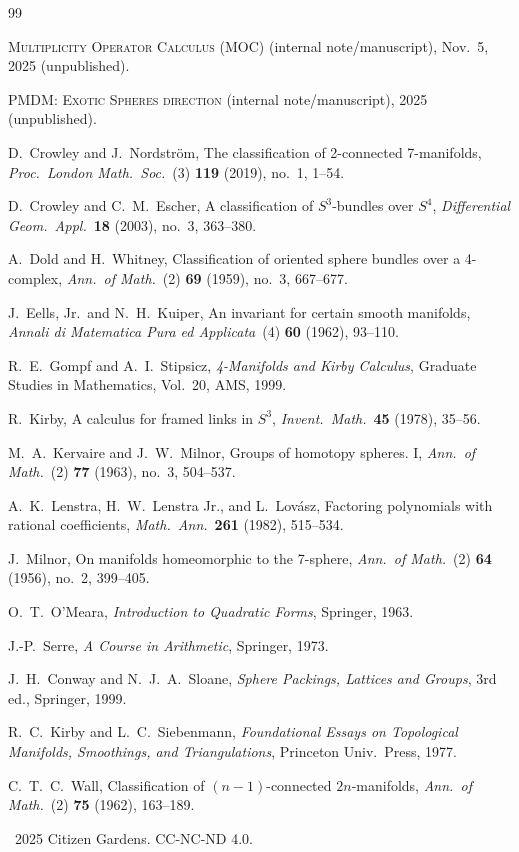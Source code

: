 \documentclass[11pt]{article}
\begin{document}
\begin{thebibliography}{99}

\textsc{Multiplicity Operator Calculus (MOC)} (internal note/manuscript), Nov.\ 5, 2025 (unpublished).

\textsc{PMDM: Exotic Spheres direction} (internal note/manuscript), 2025 (unpublished).

D.~Crowley and J.~Nordstr{\"o}m,
\newblock The classification of 2-connected 7-manifolds,
\newblock \emph{Proc.\ London Math.\ Soc.}\ (3) \textbf{119} (2019), no.~1, 1--54.

D.~Crowley and C.~M.~Escher,
\newblock A classification of $S^3$-bundles over $S^4$,
\newblock \emph{Differential Geom.\ Appl.}\ \textbf{18} (2003), no.~3, 363--380.

A.~Dold and H.~Whitney,
\newblock Classification of oriented sphere bundles over a 4-complex,
\newblock \emph{Ann.\ of Math.}\ (2) \textbf{69} (1959), no.~3, 667--677.

J.~Eells, Jr.\ and N.~H.~Kuiper,
\newblock An invariant for certain smooth manifolds,
\newblock \emph{Annali di Matematica Pura ed Applicata}\ (4) \textbf{60} (1962), 93--110.

R.~E.~Gompf and A.~I.~Stipsicz,
\newblock \emph{4-Manifolds and Kirby Calculus},
\newblock Graduate Studies in Mathematics, Vol.\ 20, AMS, 1999.

R.~Kirby,
\newblock A calculus for framed links in $S^3$,
\newblock \emph{Invent.\ Math.}\ \textbf{45} (1978), 35--56.

M.~A.~Kervaire and J.~W.~Milnor,
\newblock Groups of homotopy spheres. I,
\newblock \emph{Ann.\ of Math.}\ (2) \textbf{77} (1963), no.~3, 504--537.

A.~K.~Lenstra, H.~W.~Lenstra Jr., and L.~Lov{\'a}sz,
\newblock Factoring polynomials with rational coefficients,
\newblock \emph{Math.\ Ann.}\ \textbf{261} (1982), 515--534.

J.~Milnor,
\newblock On manifolds homeomorphic to the 7-sphere,
\newblock \emph{Ann.\ of Math.}\ (2) \textbf{64} (1956), no.~2, 399--405.

O.~T.~O'Meara,
\newblock \emph{Introduction to Quadratic Forms},
\newblock Springer, 1963.

J.-P.~Serre,
\newblock \emph{A Course in Arithmetic},
\newblock Springer, 1973.

J.~H.~Conway and N.~J.~A.~Sloane,
\newblock \emph{Sphere Packings, Lattices and Groups}, 3rd ed.,
\newblock Springer, 1999.

R.~C.~Kirby and L.~C.~Siebenmann,
\newblock \emph{Foundational Essays on Topological Manifolds, Smoothings, and Triangulations},
\newblock Princeton Univ.\ Press, 1977.

C.~T.~C.~Wall,
\newblock Classification of $(n-1)$-connected $2n$-manifolds,
\newblock \emph{Ann.\ of Math.}\ (2) \textbf{75} (1962), 163--189.

\end{thebibliography}

\vspace{1em}
\noindent\textcopyright\ 2025 Citizen Gardens. CC-NC-ND 4.0.
\end{document}
